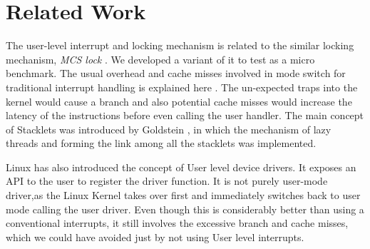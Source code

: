 \section{Related Work}

The user-level interrupt and locking mechanism is related to the similar
locking mechanism, \textit{MCS lock} \cite{mellor1991synchronization}. 
We developed a variant of it to test as a micro benchmark. The usual overhead
and cache misses involved in mode switch for traditional interrupt handling 
is explained here \cite{parker}. The un-expected traps into the kernel
would cause a branch and also potential cache misses would increase the latency
of the instructions before even calling the user handler. The main concept of
Stacklets was introduced by Goldstein \cite{goldstein}, in which the mechanism
of lazy threads and forming the link among all the stacklets was implemented.

Linux has also introduced the concept of User level device drivers. It exposes
an API to the user to register the driver function. It is not purely user-mode
driver,as the Linux Kernel takes over first and immediately switches back to 
user mode calling the user driver. Even though this is considerably better
than using a conventional interrupts, it still involves the excessive
branch and cache misses, which we could have avoided just by not using User
level interrupts.


\lipsum[2-2]

